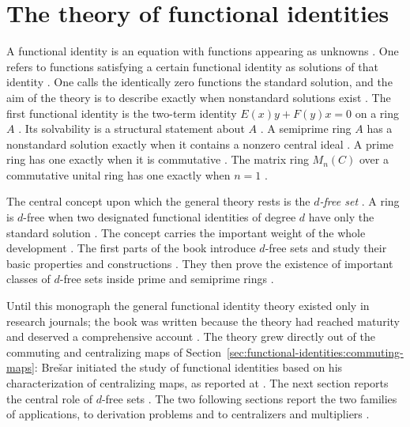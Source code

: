 \section{The theory of functional identities}\label{sec:functional-identities:fi-theory}

A functional identity is an equation with functions appearing as unknowns
\cite[p.~9]{BresarMartindaleChebotar2007FI}. One refers to functions
satisfying a certain functional identity as solutions of that identity
\cite[p.~9]{BresarMartindaleChebotar2007FI}. One calls the identically
zero functions the standard solution, and the aim of the theory is to
describe exactly when nonstandard solutions exist
\cite[p.~9]{BresarMartindaleChebotar2007FI}. The first functional identity
is the two-term identity $E(x)y+F(y)x=0$ on a ring $A$
\cite[Example~1.1, p.~9]{BresarMartindaleChebotar2007FI}. Its solvability
is a structural statement about $A$
\cite[Example~1.1, p.~9]{BresarMartindaleChebotar2007FI}. A semiprime
ring $A$ has a nonstandard solution exactly when it contains a nonzero
central ideal \cite[Example~1.1, p.~9]{BresarMartindaleChebotar2007FI}.
A prime ring has one exactly when it is commutative
\cite[Example~1.1, p.~9]{BresarMartindaleChebotar2007FI}. The matrix
ring $M_n(C)$ over a commutative unital ring has one exactly when $n=1$
\cite[Example~1.1, p.~9]{BresarMartindaleChebotar2007FI}.

The central concept upon which the general theory rests is the
\emph{$d$-free set} \cite[p.~x]{BresarMartindaleChebotar2007FI}. A ring is
$d$-free when two designated functional identities of degree $d$ have only
the standard solution \cite[p.~21]{BresarMartindaleChebotar2007FI}. The
concept carries the important weight of the whole development
\cite[p.~21]{BresarMartindaleChebotar2007FI}. The first
parts of the book introduce $d$-free sets and study their basic properties
and constructions \cite[p.~x]{BresarMartindaleChebotar2007FI}. They then
prove the existence of important classes of $d$-free sets inside prime and
semiprime rings \cite[p.~x]{BresarMartindaleChebotar2007FI}.

Until this monograph the general functional identity theory existed only
in research journals; the book was written because the theory had reached
maturity and deserved a comprehensive account
\cite[p.~ix]{BresarMartindaleChebotar2007FI}. The theory grew directly
out of the commuting and centralizing maps of
Section~\ref{sec:functional-identities:commuting-maps}: Bre\v{s}ar initiated
the study of functional identities based on his characterization of
centralizing maps, as reported at \cite[p.~333]{LeeTK1997Centralizing}.
The next section reports the central role of $d$-free sets
\cite[p.~x]{BresarMartindaleChebotar2007FI}. The two following sections
report the two families of applications, to derivation problems and to
centralizers and multipliers
\cite[p.~x]{BresarMartindaleChebotar2007FI}.
